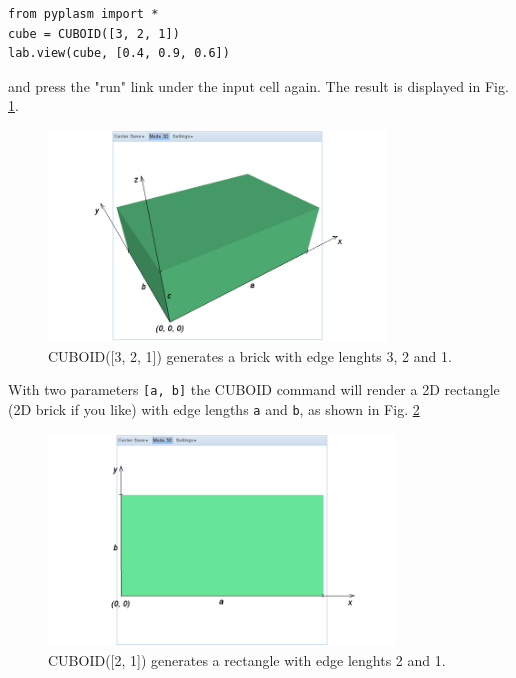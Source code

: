\documentclass[article,A4,12pt]{llncs}
\begin{document}
\begin{verbatim}
from pyplasm import *
cube = CUBOID([3, 2, 1])
lab.view(cube, [0.4, 0.9, 0.6])
\end{verbatim}
and press the "run" link under the input cell again. The result is 
displayed in Fig. \ref{fig:cuboid-1}.


\begin{figure}[!ht]
\begin{center}
\includegraphics[width=0.8\textwidth]{img/cuboid-1.png}
\end{center}
\vspace{-2mm}
\caption{CUBOID([3, 2, 1]) generates a brick with edge lenghts 3, 2 and 1.}
\label{fig:cuboid-1}
\end{figure}
\noindent
With two parameters {\tt [a, b]} the CUBOID command will render a 2D rectangle 
(2D brick if you like) with edge lengths {\tt a} and {\tt b}, as shown in 
Fig. \ref{fig:cuboid-2}

\newpage

\begin{figure}[!ht]
\begin{center}
\includegraphics[width=0.82\textwidth]{img/cuboid-2.png}
\end{center}
\vspace{-2mm}
\caption{CUBOID([2, 1]) generates a rectangle with edge lenghts 2 and 1.}
\label{fig:cuboid-2}
\end{figure}
\end{document}
